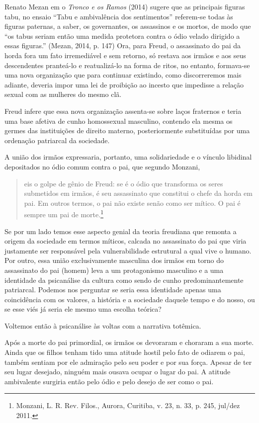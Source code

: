 Renato Mezan em o \emph{Tronco e os Ramos} (2014) sugere que as
principais figuras tabu, no ensaio ``Tabu e ambivalência dos
sentimentos'' referem-se todas às figuras paternas, a saber, os
governantes, os assassinos e os mortos, de modo que ``os tabus seriam
então uma medida protetora contra o ódio velado dirigido a essas
figuras.'' (Mezan, 2014, p. 147) Ora, para Freud, o assassinato do pai
da horda fora um fato irremediável e sem retorno, só restava aos irmãos
e aos seus descendentes pranteá-lo e reatualizá-lo na forma de ritos, no
entanto, formava-se uma nova organização que para continuar existindo,
como discorreremos mais adiante, deveria impor uma lei de proibição ao
incesto que impedisse a relação sexual com as mulheres do mesmo clã.

Freud infere que essa nova organização assenta-se sobre laços fraternos
e teria uma base afetiva de cunho homossexual masculino, contendo ela
mesma os germes das instituições de direito materno, posteriormente
substituídas por uma ordenação patriarcal da sociedade.

A união dos irmãos expressaria, portanto, uma solidariedade e o vínculo
libidinal depositados no ódio comum contra o pai, que segundo Monzani,

\begin{quote}
eis o golpe de gênio de Freud: se é o ódio que transforma os seres
submetidos em irmãos, é seu assassinato que constitui o chefe da horda
em pai. Em outros termos, o pai não existe senão como ser mítico. O pai
é sempre um pai de morte.\footnote{Monzani, L. R. Rev. Filos., Aurora,
  Curitiba, v. 23, n. 33, p. 245, jul/dez 2011.}
\end{quote}

Se por um lado temos esse aspecto genial da teoria freudiana que remonta
a origem da sociedade em termos míticos, calcada no assassinato do pai
que viria justamente ser responsável pela vulnerabilidade estrutural a
qual vive o humano. Por outro, essa união exclusivamente masculina dos
irmãos em torno do assassinato do pai (homem) leva a um protagonismo
masculino e a uma identidade da psicanálise da cultura como sendo de
cunho predominantemente patriarcal. Podemos nos perguntar se seria essa
identidade apenas uma coincidência com os valores, a história e a
sociedade daquele tempo e do nosso, ou se esse viés já seria ele mesmo
uma escolha teórica?

Voltemos então à psicanálise às voltas com a narrativa totêmica.

Após a morte do pai primordial, os irmãos os devoraram e choraram a sua
morte. Ainda que os filhos tenham tido uma atitude hostil pelo fato de
odiarem o pai, também sentiam por ele admiração pelo seu poder e por sua
força. Apesar de ter seu lugar desejado, ninguém mais ousava ocupar o
lugar do pai. A atitude ambivalente surgiria então pelo ódio e pelo
desejo de ser como o pai.

